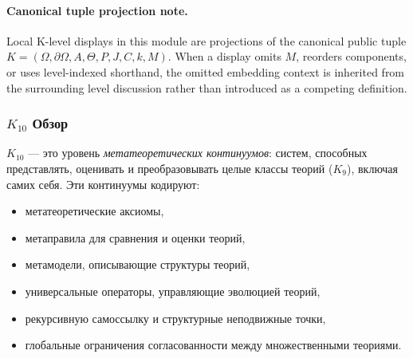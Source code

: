 



\paragraph{Canonical tuple projection note.}
Local K-level displays in this module are projections of the canonical public tuple \(K=(\Omega,\partial\Omega,A,\Theta,P,J,C,k,M)\). When a display omits \(M\), reorders components, or uses level-indexed shorthand, the omitted embedding context is inherited from the surrounding level discussion rather than introduced as a competing definition.

\subsubsection{$K_{10}$ Обзор}
\label{sec:k10-overview}

$K_{10}$ — это уровень \emph{метатеоретических континуумов}: систем, способных
представлять, оценивать и преобразовывать целые классы теорий ($K_9$),
включая самих себя. Эти континуумы кодируют:
\begin{itemize}
    \item метатеоретические аксиомы,
    \item метаправила для сравнения и оценки теорий,
    \item метамодели, описывающие структуры теорий,
    \item универсальные операторы, управляющие эволюцией теорий,
    \item рекурсивную самоссылку и структурные неподвижные точки,
    \item глобальные ограничения согласованности между множественными теориями.
\end{itemize}

